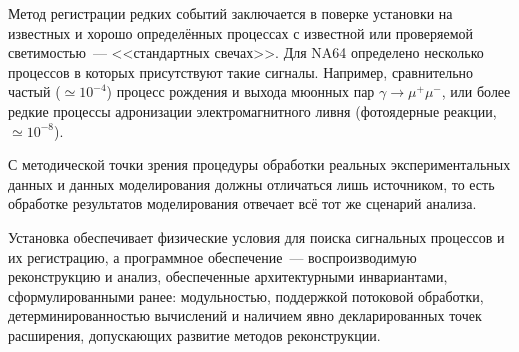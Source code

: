 Метод регистрации редких событий заключается в поверке
установки на известных и хорошо определённых процессах с известной
или проверяемой светимостью~--- <<стандартных свечах>>. Для NA64
определено несколько процессов в которых присутствуют такие сигналы.
Например, сравнительно частый ($\simeq10^{-4}$) процесс рождения и
выхода мюонных пар $\gamma\rightarrow\mu^{+}\mu^{-}$, или
более редкие процессы адронизации электромагнитного
ливня (фотоядерные реакции, $\simeq 10^{-8}$).

С методической точки зрения процедуры обработки реальных
экспериментальных данных и данных моделирования должны отличаться
лишь источником, то есть обработке результатов моделирования
отвечает всё тот же сценарий анализа.

Установка обеспечивает физические условия для поиска сигнальных
процессов и их регистрацию, а программное
обеспечение~--- воспроизводимую реконструкцию и анализ,
обеспеченные архитектурными инвариантами,
сформулированными ранее: модульностью, поддержкой потоковой
обработки, детерминированностью вычислений и наличием явно
декларированных точек расширения, допускающих развитие методов
реконструкции.

%

